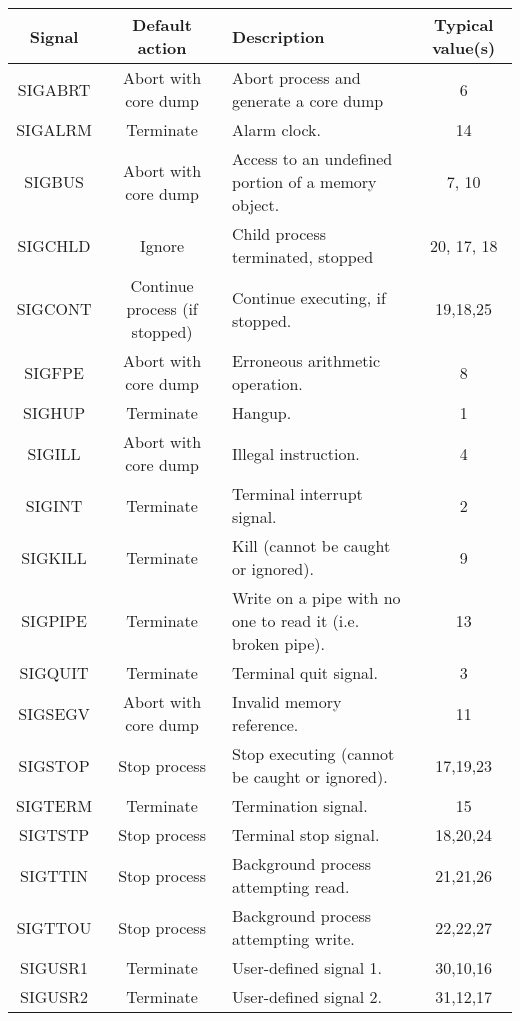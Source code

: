 \begin{table*}[H]
	\begin{tabular}{|c|c|p{4cm}|c|}
		\hline
		\textbf{ Signal} & \textbf{ Default action} & \textbf{ Description} & \textbf{ Typical value(s)} \\ \hline
		 SIGABRT &  Abort with core dump &  Abort process and generate a core dump &  6 \\ \hline
		 SIGALRM &  Terminate &  Alarm clock. &  14 \\ \hline
		 SIGBUS &  Abort with core dump &  Access to an undefined portion of a memory object. &  7, 10 \\ \hline
		 SIGCHLD &  Ignore &  Child process terminated, stopped &  20, 17, 18 \\ \hline
		 SIGCONT &  Continue process (if stopped) &  Continue executing, if stopped. &  19,18,25 \\ \hline
		 SIGFPE &  Abort with core dump &  Erroneous arithmetic operation. &  8 \\ \hline
		 SIGHUP &  Terminate &  Hangup. &  1 \\ \hline
		 SIGILL &  Abort with core dump &  Illegal instruction. &  4 \\ \hline
		 SIGINT &  Terminate &  Terminal interrupt signal. &  2 \\ \hline
		 SIGKILL &  Terminate &  Kill (cannot be caught or ignored). &  9 \\ \hline
		 SIGPIPE &  Terminate &  Write on a pipe with no one to read it (i.e. broken pipe). &  13 \\ \hline
		 SIGQUIT &  Terminate &  Terminal quit signal. &  3 \\ \hline
		 SIGSEGV &  Abort with core dump &  Invalid memory reference. &  11 \\ \hline
		 SIGSTOP &  Stop process &  Stop executing (cannot be caught or ignored). &  17,19,23 \\ \hline
		 SIGTERM &  Terminate &  Termination signal. &  15 \\ \hline
		 SIGTSTP &  Stop process &  Terminal stop signal. &  18,20,24 \\ \hline
		 SIGTTIN &  Stop process &  Background process attempting read. &  21,21,26 \\ \hline
		 SIGTTOU &  Stop process &  Background process attempting write. &  22,22,27 \\ \hline
		 SIGUSR1 &  Terminate &  User-defined signal 1. &  30,10,16 \\ \hline
		 SIGUSR2 &  Terminate &  User-defined signal 2. &  31,12,17 \\ \hline

\end{tabular}
\end{table*}
